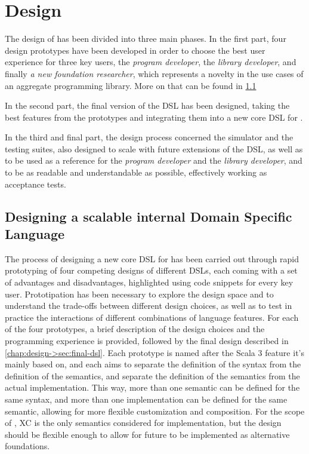 \chapter{Design}
\label{chap:design}
The design of \this has been divided into three main phases.
%
In the first part, four design prototypes have been developed in order to choose the best user experience for three key users, the \textit{program developer}, the \textit{library developer}, and finally \textit{a new foundation researcher}, which represents a novelty in the use cases of an aggregate programming library.
%
More on that can be found in \cref{chap:design->sec:dsl}

In the second part, the final version of the \ac{DSL} has been designed, taking the best features from the prototypes and integrating them into a new core \ac{DSL} for \this.

In the third and final part, the design process concerned the simulator and the testing suites, also designed to scale with future extensions of the \ac{DSL}, as well as to be used as a reference for the \textit{program developer} and the \textit{library developer}, and to be as readable and understandable as possible, effectively working as acceptance tests.


\section{Designing a scalable internal Domain Specific Language} \label{chap:design->sec:dsl}

The process of designing a new core \ac{DSL} for \this has been carried out through rapid prototyping of four competing designs of different \acp{DSL}, each coming with a set of advantages and disadvantages, highlighted using code snippets for every key user.
%
Prototipation has been necessary to explore the design space and to understand the trade-offs between different design choices, as well as to test in practice the interactions of different combinations of language features.
%
For each of the four prototypes, a brief description of the design choices and the programming experience is provided, followed by the final design described in \cref{chap:design->sec:final-dsl}.
%
Each prototype is named after the Scala 3 feature it's mainly based on, and each aims to separate the definition of the syntax from the definition of the semantics, and separate the definition of the semantics from the actual implementation.
%
This way, more than one semantic can be defined for the same syntax, and more than one implementation can be defined for the same semantic, allowing for more flexible customization and composition.
%
For the scope of \this, \ac{XC}\cite{xc} is the only semantics considered for implementation, but the design should be flexible enough to allow for future  to be implemented as alternative foundations.

